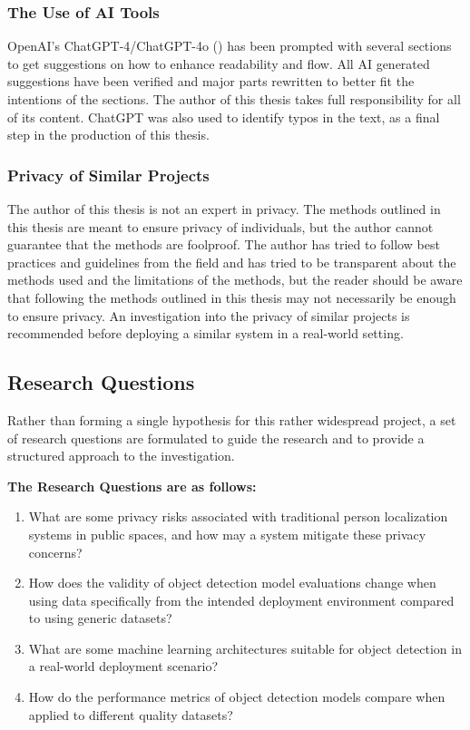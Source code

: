 \subsubsection{The Use of AI Tools}
OpenAI's ChatGPT-4/ChatGPT-4o (\cite{openai2024chatgpt}) has been prompted with several sections to get suggestions on how to enhance readability and flow. All AI generated suggestions have been verified and major parts rewritten to better fit the intentions of the sections. The author of this thesis takes full responsibility for all of its content. ChatGPT was also used to identify typos in the text, as a final step in the production of this thesis.

\subsubsection{Privacy of Similar Projects}
The author of this thesis is not an expert in privacy. The methods outlined in this thesis are meant to ensure privacy of individuals, but the author cannot guarantee that the methods are foolproof. The author has tried to follow best practices and guidelines from the field and has tried to be transparent about the methods used and the limitations of the methods, but the reader should be aware that following the methods outlined in this thesis may not necessarily be enough to ensure privacy. An investigation into the privacy of similar projects is recommended before deploying a similar system in a real-world setting.

\subsection{Research Questions}
\label{sec:research_questions}
Rather than forming a single hypothesis for this rather widespread project, a set of research questions are formulated to guide the research and to provide a structured approach to the investigation.


\textbf{The Research Questions are as follows:}
\begin{enumerate}
	\item What are some privacy risks associated with traditional person localization systems in public spaces, and how may a system mitigate these privacy concerns?
	\item How does the validity of object detection model evaluations change when using data specifically from the intended deployment environment compared to using generic datasets?
	\item What are some machine learning architectures suitable for object detection in a real-world deployment scenario?
	\item How do the performance metrics of object detection models compare when applied to different quality datasets?
\end{enumerate}

